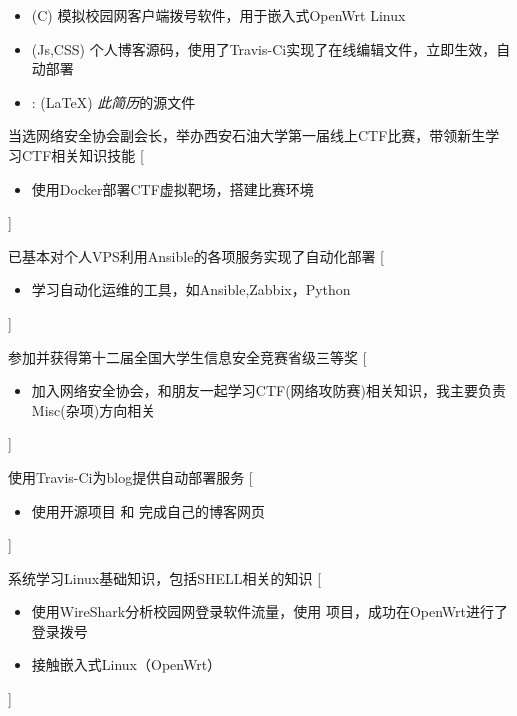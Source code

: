 \documentclass[zh]{resume}
\begin{document}
\begin{itemize}
  \item {}
  (C)
  模拟校园网客户端拨号软件，用于嵌入式OpenWrt Linux
  \item {}
  (Js,CSS)
  个人博客源码，使用了Travis-Ci实现了在线编辑文件，立即生效，自动部署
  \item {}:
    (\LaTeX)
    \emph{此简历}的源文件
\end{itemize}


\begin{experiences}
  {当选网络安全协会副会长，举办西安石油大学第一届线上CTF比赛，带领新生学习CTF相关知识技能}%
  [\begin{itemize}
    \item 使用Docker部署CTF虚拟靶场，搭建比赛环境
  \end{itemize}
  ]
  
  \separator{0.5ex}
  {已基本对个人VPS利用Ansible的各项服务实现了自动化部署 }%
  [\begin{itemize}
    \item 学习自动化运维的工具，如Ansible,Zabbix，Python
  \end{itemize}
  ]
  
  \separator{0.5ex}
  {参加并获得第十二届全国大学生信息安全竞赛省级三等奖}%
  [\begin{itemize}
    \item 加入网络安全协会，和朋友一起学习CTF(网络攻防赛)相关知识，我主要负责Misc(杂项)方向相关
  \end{itemize}
  ]

  \separator{0.5ex}
    {使用Travis-Ci为blog提供自动部署服务}%
    [\begin{itemize}
      \item 使用开源项目  和  
      完成自己的博客网页
    \end{itemize}]

  \separator{0.5ex}

    {系统学习Linux基础知识，包括SHELL相关的知识}%
    [\begin{itemize}
      \item 使用WireShark分析校园网登录软件流量，使用  项目，成功在OpenWrt进行了登录拨号
      \item 接触嵌入式Linux（OpenWrt）
    \end{itemize}]
\end{experiences}
\end{document}
